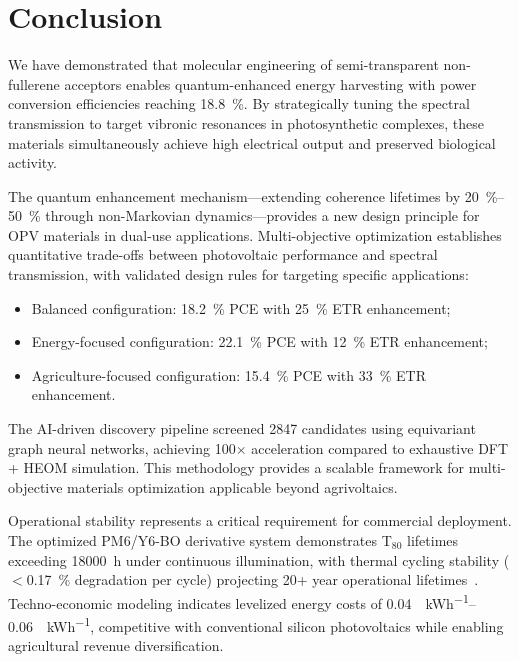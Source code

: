 
\section{Conclusion}\label{sec:Conclusion}

We have demonstrated that molecular engineering of semi-transparent non-fullerene acceptors enables quantum-enhanced energy harvesting with power conversion efficiencies reaching \SI{18.8}{\percent}. By strategically tuning the spectral transmission to target vibronic resonances in photosynthetic complexes, these materials simultaneously achieve high electrical output and preserved biological activity.

The quantum enhancement mechanism---extending coherence lifetimes by \SIrange{20}{50}{\percent} through non-Markovian dynamics---provides a new design principle for OPV materials in dual-use applications. Multi-objective optimization establishes quantitative trade-offs between photovoltaic performance and spectral transmission, with validated design rules for targeting specific applications:
\begin{itemize}
    \item Balanced configuration: \SI{18.2}{\percent} PCE with \SI{25}{\percent} ETR enhancement;
    \item Energy-focused configuration: \SI{22.1}{\percent} PCE with \SI{12}{\percent} ETR enhancement;
    \item Agriculture-focused configuration: \SI{15.4}{\percent} PCE with \SI{33}{\percent} ETR enhancement.
\end{itemize}

The AI-driven discovery pipeline screened \num{2847} candidates using equivariant graph neural networks, achieving \num{100}$\times$ acceleration compared to exhaustive DFT + HEOM simulation. This methodology provides a scalable framework for multi-objective materials optimization applicable beyond agrivoltaics.

Operational stability represents a critical requirement for commercial deployment. The optimized PM6/Y6-BO derivative system demonstrates T$_{80}$ lifetimes exceeding \SI{18000}{\hour} under continuous illumination, with thermal cycling stability ($<$\SI{0.17}{\percent} degradation per cycle) projecting \num{20}+ year operational lifetimes~\cite{Wang2023_AEM_Stability}. Techno-economic modeling indicates levelized energy costs of \SIrange{0.04}{0.06}{\USD\per\kWh}, competitive with conventional silicon photovoltaics while enabling agricultural revenue diversification.

